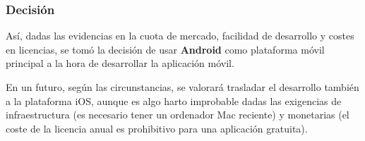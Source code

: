 \subsubsection{Decisión}

Así, dadas las evidencias en la cuota de mercado, facilidad de desarrollo y
costes en licencias, se tomó la decisión de usar \textbf{Android} como
plataforma móvil principal a la hora de desarrollar la aplicación móvil.

En un futuro, según las circunstancias, se valorará trasladar el desarrollo
también a la plataforma iOS, aunque es algo harto improbable dadas las
exigencias de infraestructura (es necesario tener un ordenador Mac reciente) y
monetarias (el coste de la licencia anual es prohibitivo para una aplicación
gratuita).

